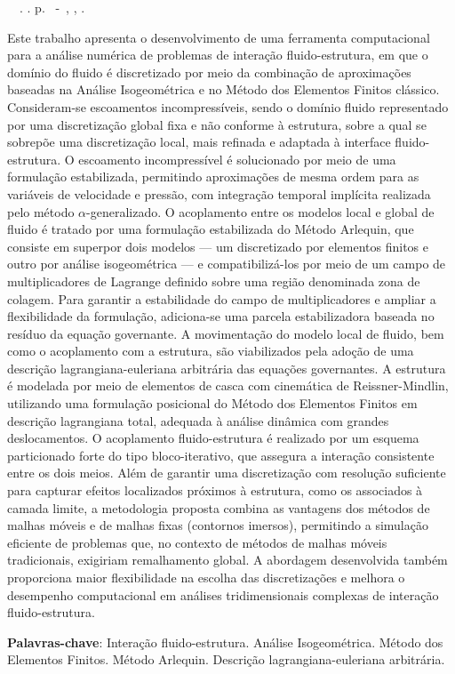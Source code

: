 \setlength{\absparsep}{18pt} %
\begin{resumo}
	\begin{flushleft} 
			\setlength{\absparsep}{0pt} %
			\SingleSpacing 
			\imprimirautorabr~~\textbf{\imprimirtituloresumo}.	\imprimirdata. \pageref{LastPage} p. 
			\imprimirtipotrabalho~-~\imprimirinstituicao, \imprimirlocal, \imprimirdata. 
 	\end{flushleft}
\OnehalfSpacing 			
Este trabalho apresenta o desenvolvimento de uma ferramenta computacional para a análise numérica de problemas de interação fluido-estrutura, em que o domínio do fluido é discretizado por meio da combinação de aproximações baseadas na Análise Isogeométrica e no Método dos Elementos Finitos clássico. Consideram-se escoamentos incompressíveis, sendo o domínio fluido representado por uma discretização global fixa e não conforme à estrutura, sobre a qual se sobrepõe uma discretização local, mais refinada e adaptada à interface fluido-estrutura.
O escoamento incompressível é solucionado por meio de uma formulação estabilizada, permitindo aproximações de mesma ordem para as variáveis de velocidade e pressão, com integração temporal implícita realizada pelo método $\alpha$-generalizado. O acoplamento entre os modelos local e global de fluido é tratado por uma formulação estabilizada do Método Arlequin, que consiste em superpor dois modelos — um discretizado por elementos finitos e outro por análise isogeométrica — e compatibilizá-los por meio de um campo de multiplicadores de Lagrange definido sobre uma região denominada zona de colagem. Para garantir a estabilidade do campo de multiplicadores e ampliar a flexibilidade da formulação, adiciona-se uma parcela estabilizadora baseada no resíduo da equação governante. A movimentação do modelo local de fluido, bem como o acoplamento com a estrutura, são viabilizados pela adoção de uma descrição lagrangiana-euleriana arbitrária das equações governantes.
A estrutura é modelada por meio de elementos de casca com cinemática de Reissner-Mindlin, utilizando uma formulação posicional do Método dos Elementos Finitos em descrição lagrangiana total, adequada à análise dinâmica com grandes deslocamentos. O acoplamento fluido-estrutura é realizado por um esquema particionado forte do tipo bloco-iterativo, que assegura a interação consistente entre os dois meios. Além de garantir uma discretização com resolução suficiente para capturar efeitos localizados próximos à estrutura, como os associados à camada limite, a metodologia proposta combina as vantagens dos métodos de malhas móveis e de malhas fixas (contornos imersos), permitindo a simulação eficiente de problemas que, no contexto de métodos de malhas móveis tradicionais, exigiriam remalhamento global. A abordagem desenvolvida também proporciona maior flexibilidade na escolha das discretizações e melhora o desempenho computacional em análises tridimensionais complexas de interação fluido-estrutura.

\textbf{Palavras-chave}: Interação fluido-estrutura. Análise Isogeométrica. Método dos Elementos Finitos. Método Arlequin. Descrição lagrangiana-euleriana arbitrária.
\end{resumo}

